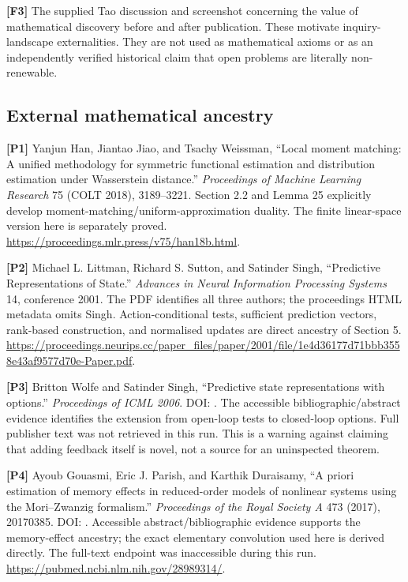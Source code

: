 \documentclass[11pt,a4paper]{article}
\begin{document}
\textbf{{[}F3{]}} The supplied Tao discussion and screenshot concerning
the value of mathematical discovery before and after publication. These
motivate inquiry-landscape externalities. They are not used as
mathematical axioms or as an independently verified historical claim
that open problems are literally non-renewable.

\subsection*{External mathematical
ancestry}\label{external-mathematical-ancestry}

\textbf{{[}P1{]}} Yanjun Han, Jiantao Jiao, and Tsachy Weissman, ``Local
moment matching: A unified methodology for symmetric functional
estimation and distribution estimation under Wasserstein distance.''
\emph{Proceedings of Machine Learning Research} 75 (COLT 2018),
3189--3221. Section 2.2 and Lemma 25 explicitly develop
moment-matching/uniform-approximation duality. The finite linear-space
version here is separately proved.
\url{https://proceedings.mlr.press/v75/han18b.html}.

\textbf{{[}P2{]}} Michael L. Littman, Richard S. Sutton, and Satinder
Singh, ``Predictive Representations of State.'' \emph{Advances in Neural
Information Processing Systems} 14, conference 2001. The PDF identifies
all three authors; the proceedings HTML metadata omits Singh.
Action-conditional tests, sufficient prediction vectors, rank-based
construction, and normalised updates are direct ancestry of Section 5.
\url{https://proceedings.neurips.cc/paper_files/paper/2001/file/1e4d36177d71bbb3558e43af9577d70e-Paper.pdf}.

\textbf{{[}P3{]}} Britton Wolfe and Satinder Singh, ``Predictive state
representations with options.'' \emph{Proceedings of ICML 2006}. DOI:
. The accessible bibliographic/abstract
evidence identifies the extension from open-loop tests to closed-loop
options. Full publisher text was not retrieved in this run. This is a
warning against claiming that adding feedback itself is novel, not a
source for an uninspected theorem.

\textbf{{[}P4{]}} Ayoub Gouasmi, Eric J. Parish, and Karthik Duraisamy,
``A priori estimation of memory effects in reduced-order models of
nonlinear systems using the Mori--Zwanzig formalism.'' \emph{Proceedings
of the Royal Society A} 473 (2017), 20170385. DOI:
. Accessible abstract/bibliographic
evidence supports the memory-effect ancestry; the exact elementary
convolution used here is derived directly. The full-text endpoint was
inaccessible during this run.
\url{https://pubmed.ncbi.nlm.nih.gov/28989314/}.
\end{document}
